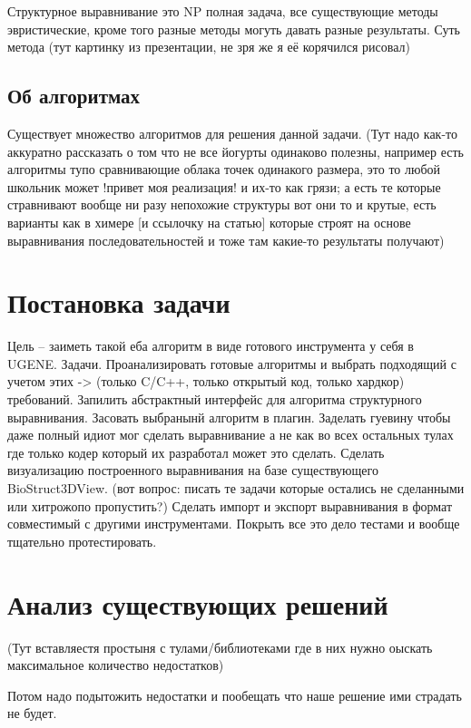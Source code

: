 \documentclass[a4paper, 14pt, titlepage, utf8]{extarticle}
\begin{document}
Структурное выравнивание это NP полная задача, все существующие методы эвристические, кроме того разные методы могуть давать разные результаты.
Суть метода (тут картинку из презентации, не зря же я её корячился рисовал)

\subsection{Об алгоритмах}
Существует множество алгоритмов для решения данной задачи. (Тут надо как-то аккуратно рассказать о том что не все йогурты одинаково полезны, например есть алгоритмы тупо сравнивающие облака точек одинакого размера, это то любой школьник может !привет моя реализация! и их-то как грязи; а есть те которые стравнивают вообще ни разу непохожие структуры вот они то и крутые, есть варианты как в химере [и ссылочку на статью] которые строят на основе выравнивания последовательностей и тоже там какие-то результаты получают)
 
\section{Постановка задачи}	%

Цель -- заиметь такой еба алгоритм в виде готового инструмента у себя в UGENE. 
Задачи.
Проанализировать готовые алгоритмы и выбрать подходящий с учетом этих -> (только C/C++, только открытый код, только хардкор) требований. Запилить абстрактный интерфейс для алгоритма структурного выравнивания. Засовать выбранынй алгоритм в плагин. Заделать гуевину чтобы даже полный идиот мог сделать выравнивание а не как во всех остальных тулах где только кодер который их разработал может это сделать. Сделать визуализацию построенного выравнивания на базе существующего BioStruct3DView. (вот вопрос: писать те задачи которые остались не сделанными или хитрожопо пропустить?) Сделать импорт и экспорт выравнивания в формат совместимый с другими инструментами. Покрыть все это дело тестами и вообще тщательно протестировать.

\section{Анализ существующих решений}

(Тут вставляестя простыня с тулами/библиотеками где в них нужно оыскать максимальное количество недостатков)

Потом надо подытожить недостатки и пообещать что наше решение ими страдать не будет.
\end{document}
